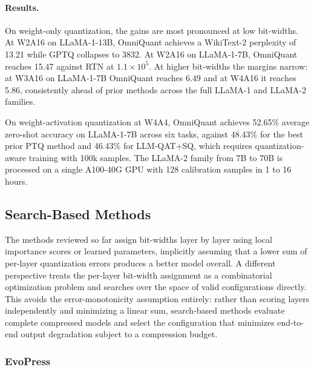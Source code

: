 \paragraph{Results.}
On weight-only quantization, the gains are most pronounced at low bit-widths. At W2A16 on LLaMA-1-13B, OmniQuant achieves a WikiText-2 perplexity of 13.21 while GPTQ collapses to 3832. At W2A16 on LLaMA-1-7B, OmniQuant reaches 15.47 against RTN at $1.1 \times 10^5$. At higher bit-widths the margins narrow: at W3A16 on LLaMA-1-7B OmniQuant reaches 6.49 and at W4A16 it reaches 5.86, consistently ahead of prior methods across the full LLaMA-1 and LLaMA-2 families.

On weight-activation quantization at W4A4, OmniQuant achieves 52.65\% average zero-shot accuracy on LLaMA-1-7B across six tasks, against 48.43\% for the best prior PTQ method and 46.43\% for LLM-QAT+SQ, which requires quantization-aware training with 100k samples. The LLaMA-2 family from 7B to 70B is processed on a single A100-40G GPU with 128 calibration samples in 1 to 16 hours.

\subsection{Search-Based Methods}

The methods reviewed so far assign bit-widths layer by layer using local importance scores or learned parameters, implicitly assuming that a lower sum of per-layer quantization errors produces a better model overall. A different perspective treats the per-layer bit-width assignment as a combinatorial optimization problem and searches over the space of valid configurations directly. This avoids the error-monotonicity assumption entirely: rather than scoring layers independently and minimizing a linear sum, search-based methods evaluate complete compressed models and select the configuration that minimizes end-to-end output degradation subject to a compression budget.

\subsubsection{EvoPress \cite{evopress2024}}


